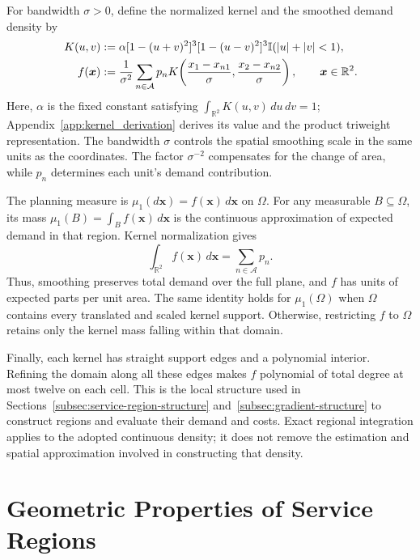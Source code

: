 \documentclass[a4paper,fleqn]{cas-sc}
\theoremstyle{remark}
\theoremstyle{plain}
\begin{document}
For bandwidth $\sigma>0$, define the normalized kernel and the smoothed demand density by
\begin{subequations}\label{eq:continuous-demand-construction}
\allowdisplaybreaks[0]
\begin{align}
    K(u,v)&:=\alpha[1-(u+v)^2]^3[1-(u-v)^2]^3\mathbb I(|u|+|v|<1),\label{eq:demand-kernel}\\
    f(\bm x)&:=\frac{1}{\sigma^2}\sum_{n\in\mathcal A}p_n K\!\left(\frac{x_1-x_{n1}}{\sigma},\frac{x_2-x_{n2}}{\sigma}\right),\qquad \bm x\in\mathbb R^2.\label{eq:smoothed-demand-density}
\end{align}
\end{subequations}
Here, $\alpha$ is the fixed constant satisfying $\int_{\mathbb R^2}K(u,v)\,du\,dv=1$; Appendix~\ref{app:kernel_derivation} derives its value and the product triweight representation. The bandwidth $\sigma$ controls the spatial smoothing scale in the same units as the coordinates. The factor $\sigma^{-2}$ compensates for the change of area, while $p_n$ determines each unit's demand contribution.

The planning measure is $\mu_1(d\bm x)=f(\bm x)\,d\bm x$ on $\Omega$. For any measurable $B\subseteq\Omega$, its mass $\mu_1(B)=\int_B f(\bm x)\,d\bm x$ is the continuous approximation of expected demand in that region. Kernel normalization gives
\begin{equation}\label{eq:smoothed-demand-mass}
    \int_{\mathbb R^2}f(\bm x)\,d\bm x=\sum_{n\in\mathcal A}p_n.
\end{equation}
Thus, smoothing preserves total demand over the full plane, and $f$ has units of expected parts per unit area. The same identity holds for $\mu_1(\Omega)$ when $\Omega$ contains every translated and scaled kernel support. Otherwise, restricting $f$ to $\Omega$ retains only the kernel mass falling within that domain.

Finally, each kernel has straight support edges and a polynomial interior. Refining the domain along all these edges makes $f$ polynomial of total degree at most twelve on each cell. This is the local structure used in Sections~\ref{subsec:service-region-structure} and~\ref{subsec:gradient-structure} to construct regions and evaluate their demand and costs. Exact regional integration applies to the adopted continuous density; it does not remove the estimation and spatial approximation involved in constructing that density.


\section{Geometric Properties of Service Regions}
\label{sec:geometric_properties}
\end{document}
